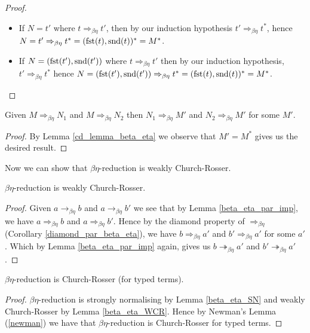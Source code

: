\begin{proof}
\begin{itemize}
\begin{itemize}
            \item If $N = t'$ where $t \Rightarrow_{\beta\eta} t'$, then by our induction hypothesis $t' \Rightarrow_{\beta\eta} t^*$, hence $N = t' \Rightarrow_{\beta\eta} t^* = (\mathrm{fst}(t), \mathrm{snd}(t))^* = M^*$.
            \item If $N = (\mathrm{fst}(t'), \mathrm{snd}(t'))$ where $t \Rightarrow_{\beta\eta} t'$ then by our induction hypothesis, $t' \Rightarrow_{\beta\eta} t^*$ hence $N = (\mathrm{fst}(t'), \mathrm{snd}(t')) \Rightarrow_{\beta\eta} t^* = (\mathrm{fst} (t), \mathrm{snd}(t))^* = M^*$.
        \end{itemize}
    \end{itemize}
\end{proof}

\begin{cor}\label{diamond_par_beta_eta}
    Given $M \Rightarrow_{\beta\eta} N_1$ and $M \Rightarrow_{\beta\eta} N_2$ then $N_1 \Rightarrow_{\beta\eta} M'$ and $N_2 \Rightarrow_{\beta\eta} M'$ for some $M'$.
\end{cor}

\begin{proof}
    By Lemma \ref{cd_lemma_beta_eta} we observe that $M' = M^*$ gives us the desired result.
\end{proof}

Now we can show that $\beta\eta$-reduction is weakly Church-Rosser.

\begin{lemma}\label{beta_eta_WCR}
    $\beta\eta$-reduction is weakly Church-Rosser.
\end{lemma}

\begin{proof}
    Given $a \to_{\beta\eta} b$ and $a \to_{\beta\eta} b'$ we see that by Lemma \ref{beta_eta_par_imp}, we have $a \Rightarrow_{\beta\eta} b$ and $a \Rightarrow_{\beta\eta} b'$. Hence by the diamond property of $\Rightarrow_{\beta\eta}$ (Corollary \ref{diamond_par_beta_eta}), we have $b \Rightarrow_{\beta\eta} a'$ and $b' \Rightarrow_{\beta\eta} a'$ for some $a'$. Which by Lemma \ref{beta_eta_par_imp} again, gives us $b \twoheadrightarrow_{\beta\eta} a'$ and $b' \twoheadrightarrow_{\beta\eta} a'$.
\end{proof}

\begin{theorem}
    $\beta\eta$-reduction is Church-Rosser (for typed terms).
\end{theorem}

\begin{proof}
    $\beta\eta$-reduction is strongly normalising by Lemma \ref{beta_eta_SN} and weakly Church-Rosser by Lemma \ref{beta_eta_WCR}. Hence by Newman's Lemma (\ref{newman}) we have that $\beta\eta$-reduction is Church-Rosser for typed terms. 
\end{proof}









